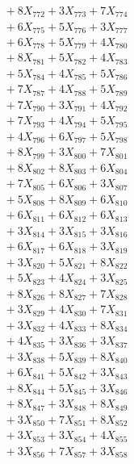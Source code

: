 \documentclass[a4paper,10pt]{article}
\begin{document}
{\begin{align}
&\;  + 8 X_{772} + 3 X_{773} + 7 X_{774} \\[0.3ex]
&\;  + 6 X_{775} + 5 X_{776} + 3 X_{777} \\[0.3ex]
&\;  + 6 X_{778} + 5 X_{779} + 4 X_{780} \\[0.3ex]
&\;  + 8 X_{781} + 5 X_{782} + 4 X_{783} \\[0.3ex]
&\;  + 5 X_{784} + 4 X_{785} + 5 X_{786} \\[0.3ex]
&\;  + 7 X_{787} + 4 X_{788} + 5 X_{789} \\[0.5ex]\allowbreak
&\;  + 7 X_{790} + 3 X_{791} + 4 X_{792} \\[0.3ex]
&\;  + 7 X_{793} + 4 X_{794} + 5 X_{795} \\[0.3ex]
&\;  + 4 X_{796} + 6 X_{797} + 5 X_{798} \\[0.3ex]
&\;  + 8 X_{799} + 3 X_{800} + 7 X_{801} \\[0.3ex]
&\;  + 8 X_{802} + 8 X_{803} + 6 X_{804} \\[0.3ex]
&\;  + 7 X_{805} + 6 X_{806} + 3 X_{807} \\[0.3ex]
&\;  + 5 X_{808} + 8 X_{809} + 6 X_{810} \\[0.3ex]
&\;  + 6 X_{811} + 6 X_{812} + 6 X_{813} \\[0.3ex]
&\;  + 3 X_{814} + 3 X_{815} + 3 X_{816} \\[0.3ex]
&\;  + 6 X_{817} + 6 X_{818} + 3 X_{819} \\[0.5ex]\allowbreak
&\;  + 3 X_{820} + 5 X_{821} + 8 X_{822} \\[0.3ex]
&\;  + 5 X_{823} + 4 X_{824} + 3 X_{825} \\[0.3ex]
&\;  + 8 X_{826} + 8 X_{827} + 7 X_{828} \\[0.3ex]
&\;  + 3 X_{829} + 4 X_{830} + 7 X_{831} \\[0.3ex]
&\;  + 3 X_{832} + 4 X_{833} + 8 X_{834} \\[0.3ex]
&\;  + 4 X_{835} + 3 X_{836} + 3 X_{837} \\[0.3ex]
&\;  + 3 X_{838} + 5 X_{839} + 8 X_{840} \\[0.3ex]
&\;  + 6 X_{841} + 5 X_{842} + 3 X_{843} \\[0.3ex]
&\;  + 8 X_{844} + 5 X_{845} + 3 X_{846} \\[0.3ex]
&\;  + 8 X_{847} + 3 X_{848} + 8 X_{849} \\[0.5ex]\allowbreak
&\;  + 3 X_{850} + 7 X_{851} + 8 X_{852} \\[0.3ex]
&\;  + 3 X_{853} + 3 X_{854} + 4 X_{855} \\[0.3ex]
&\;  + 3 X_{856} + 7 X_{857} + 3 X_{858} \\[0.3ex]

\end{align}}
\end{document}

